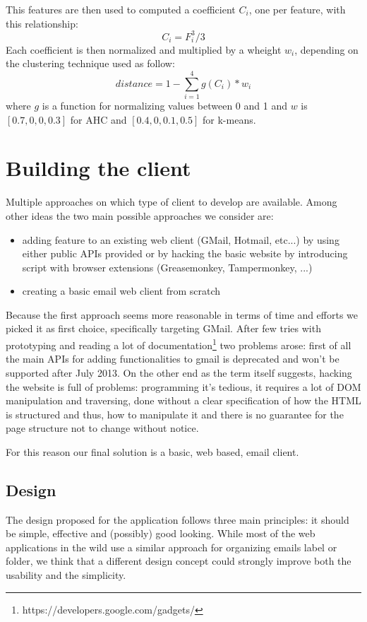\documentclass[a4paper,12pt]{report}
\begin{document}
This features are then used to computed a coefficient $C_{i}$, one per feature, with this relationship:
\[C_{i} = F_{i}^3 / 3 \]
Each coefficient is then normalized and multiplied by a wheight $w_{i}$, depending on the clustering technique used as follow:
\[distance = 1 - \sum_{i=1}^{4} g(C_i)*w_i \]
where $g$ is a function for normalizing values between 0 and 1 and $w$ is $[0.7, 0, 0, 0.3]$ for AHC and $[0.4, 0, 0.1, 0.5]$ for k-means.
\chapter{Building the client}
Multiple approaches on which type of client to develop are available. Among other ideas the two main possible approaches we consider are:
\begin{itemize}
\item adding feature to an existing web client (GMail, Hotmail, etc...) by using either public APIs provided or by hacking the basic website by introducing script with browser extensions (Greasemonkey, Tampermonkey, ...)
\item creating a basic email web client from scratch
\end{itemize}

Because the first approach seems more reasonable in terms of time and efforts we picked it as first choice, specifically targeting GMail. After few tries with prototyping and reading a lot of documentation\footnote{https://developers.google.com/gadgets/} two problems arose: first of all the main APIs for adding functionalities to gmail is deprecated and won't be supported after July 2013. On the other end as the term itself suggests, hacking the website is full of problems: programming it's tedious, it requires a lot of DOM manipulation and traversing, done without a clear specification of how the HTML is structured and thus, how to manipulate it and there is no guarantee for the page structure not to change without notice.

For this reason our final solution is a basic, web based, email client.
\section{Design}

The design proposed for the application follows three main principles: it should be simple, effective and (possibly) good looking.
While most of the web applications in the wild use a similar approach for organizing emails label or folder, we think that a different design concept could strongly improve both the usability and the simplicity.
\end{document}
